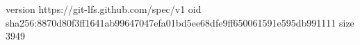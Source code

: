 version https://git-lfs.github.com/spec/v1
oid sha256:8870d80f3ff1641ab99647047efa01bd5ee68dfe9ff650061591e595db991111
size 3949

